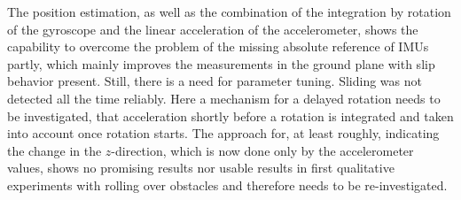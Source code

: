\documentclass[letterpaper, 10 pt, conference]{ieeeconf}  %
\begin{document}
The position estimation, as well as the combination of the integration by rotation of the gyroscope and the linear acceleration of the accelerometer, shows the capability to overcome the problem of the missing absolute reference of IMUs partly, which mainly improves the measurements in the ground plane with slip behavior present.
Still, there is a need for parameter tuning. 
Sliding was not detected all the time reliably.
Here a mechanism for a delayed rotation needs to be investigated, that acceleration shortly before a rotation is integrated and taken into account once rotation starts.
The approach for, at least roughly, indicating the change in the $z$-direction, which is now done only by the accelerometer values, shows no promising results nor usable results in first qualitative experiments with rolling over obstacles and therefore needs to be re-investigated.




\addtolength{\textheight}{-12cm}   %



















\end{document}
